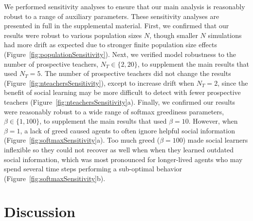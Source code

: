\documentclass[letterpaper,11.5pt]{scrartcl}
\begin{document}
We performed sensitivity analyses to ensure that our main analysis is reasonably
robust to a range of auxiliary parameters. These sensitivity analyses are presented in full in the
supplemental material. First, we confirmed that our results were robust to various population sizes $N$, though smaller $N$ simulations had more drift as expected due to stronger finite population size effects (Figure~\ref{fig:populationSensitivity}). %
Next, we verified model robustness to the number of prospective teachers, $N_T \in \{2, 20\}$, to supplement the main results that used $N_T = 5$. The number of prospective
teachers did not change the results (Figure~\ref{fig:nteachersSensitivity}), except to increase drift when $N_T = 2$, since the benefit of social learning may
be more difficult to detect with fewer prospective teachers (Figure~\ref{fig:nteachersSensitivity}a). Finally, we confirmed our results were reasonably 
robust to a wide range of
softmax greediness parameters, $\beta \in \{1, 100\}$, to supplement the main results
that used $\beta = 10$. However, when $\beta = 1$, a lack of greed caused agents to often ignore helpful social information  (Figure~\ref{fig:softmaxSensitivity}a). Too much greed ($\beta=100$) made social learners inflexible so they could not recover as well when when they learned outdated social information, which was most pronounced for longer-lived agents who may spend several time steps performing a sub-optimal behavior (Figure~\ref{fig:softmaxSensitivity}b).



\section{Discussion}
\end{document}
